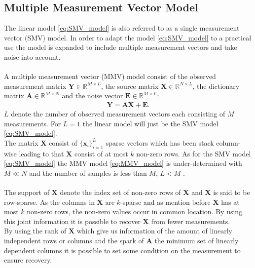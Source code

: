\subsection{Multiple Measurement Vector Model}\label{sec:MMV}
The linear model \eqref{eq:SMV_model} is also referred to as a single measurement vector (SMV) model. In order to adapt the model \eqref{eq:SMV_model} to a practical use the model is expanded to include multiple measurement vectors and take noise into account.
\\ \\
A multiple measurement vector (MMV) model consist of the observed measurement matrix $\mathbf{Y} \in \mathbb{R}^{M \times L}$, the source matrix $\mathbf{X} \in \mathbb{R}^{N \times L}$, the dictionary matrix $\mathbf{A} \in \mathbb{R}^{M \times N}$ and the noise vector $\textbf{E} \in \mathbb{R}^{M \times L}$:
\begin{align}\label{eq:MMV_model}
\mathbf{Y} = \mathbf{AX}+\textbf{E}.
\end{align}
$L$ denote the number of observed measurement vectors each consisting of $M$ measurements. For $L = 1$ the linear model will just be the SMV model \eqref{eq:SMV_model}. 
\\
The matrix $\mathbf{X}$ consist of $\lbrace \mathbf{x}_i \rbrace_{i=1}^L$ sparse vectors which has been stack column-wise leading to that $\mathbf{X}$ consist of at most $k$ non-zero rows. As for the SMV model \eqref{eq:SMV_model} the MMV model \eqref{eq:MMV_model} is under-determined with $M \ll N$ and the number of samples is less than $M$, $L < M$ \cite[p. 42]{CS}.
\\ \\
The support of $\mathbf{X}$ denote the index set of non-zero rows of $\mathbf{X}$ and $\mathbf{X}$ is said to be row-sparse. As the columns in $\mathbf{X}$ are $k$-sparse and as mention before $\mathbf{X}$ has at most $k$ non-zero rows, the non-zero values occur in common location. By using this joint information it is possible to recover $\mathbf{X}$ from fewer measurements.
\\
By using the rank of $\mathbf{X}$ which give us information of the amount of linearly independent rows or columns and the spark of $\mathbf{A}$ the minimum set of linearly dependent columns it is possible to set some condition on the measurement to ensure recovery.
\\
